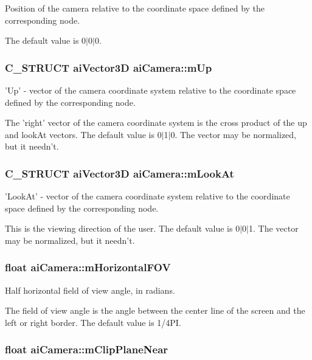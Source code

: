 Position of the camera relative to the coordinate space defined by the corresponding node.

The default value is 0$|$0$|$0. \hypertarget{structai_camera_7fb42b287389b4f99c883098268d6d1a}{
\subsubsection[mUp]{\setlength{\rightskip}{0pt plus 5cm}C\_\-STRUCT aiVector3D {\bf aiCamera::mUp}}}
\label{structai_camera_7fb42b287389b4f99c883098268d6d1a}


'Up' - vector of the camera coordinate system relative to the coordinate space defined by the corresponding node.

The 'right' vector of the camera coordinate system is the cross product of the up and lookAt vectors. The default value is 0$|$1$|$0. The vector may be normalized, but it needn't. \hypertarget{structai_camera_f9463249ac870e030fa435b1186cef23}{
\subsubsection[mLookAt]{\setlength{\rightskip}{0pt plus 5cm}C\_\-STRUCT aiVector3D {\bf aiCamera::mLookAt}}}
\label{structai_camera_f9463249ac870e030fa435b1186cef23}


'LookAt' - vector of the camera coordinate system relative to the coordinate space defined by the corresponding node.

This is the viewing direction of the user. The default value is 0$|$0$|$1. The vector may be normalized, but it needn't. \hypertarget{structai_camera_dcdea73ece19ea0a9068f5544ec23592}{
\subsubsection[mHorizontalFOV]{\setlength{\rightskip}{0pt plus 5cm}float {\bf aiCamera::mHorizontalFOV}}}
\label{structai_camera_dcdea73ece19ea0a9068f5544ec23592}


Half horizontal field of view angle, in radians.

The field of view angle is the angle between the center line of the screen and the left or right border. The default value is 1/4PI. \hypertarget{structai_camera_720e8c94c036dcefe4b13cc1c69c521e}{
\subsubsection[mClipPlaneNear]{\setlength{\rightskip}{0pt plus 5cm}float {\bf aiCamera::mClipPlaneNear}}}
\label{structai_camera_720e8c94c036dcefe4b13cc1c69c521e}


